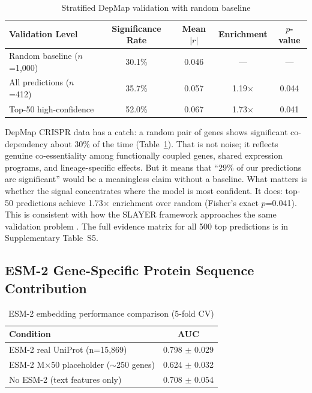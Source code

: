 \documentclass[12pt,a4paper]{article}
\begin{document}
\begin{table}[ht]
\centering
\caption{Stratified DepMap validation with random baseline}
\label{tab:depmap}
\begin{tabular}{lcccc}
\toprule
\textbf{Validation Level} & \textbf{Significance Rate} & \textbf{Mean $|r|$} & \textbf{Enrichment} & \textbf{$p$-value} \\
\midrule
Random baseline ($n$=1,000) & 30.1\% & 0.046 & --- & --- \\
All predictions ($n$=412) & 35.7\% & 0.057 & 1.19$\times$ & 0.044 \\
Top-50 high-confidence & 52.0\% & 0.067 & 1.73$\times$ & 0.041 \\
\bottomrule
\end{tabular}
\end{table}

DepMap CRISPR data has a catch: a random pair of genes shows significant co-dependency about 30\% of the time (Table~\ref{tab:depmap}). That is not noise; it reflects genuine co-essentiality among functionally coupled genes, shared expression programs, and lineage-specific effects. But it means that ``29\% of our predictions are significant'' would be a meaningless claim without a baseline. What matters is whether the signal concentrates where the model is most confident. It does: top-50 predictions achieve 1.73$\times$ enrichment over random (Fisher's exact $p$=0.041). This is consistent with how the SLAYER framework approaches the same validation problem \cite{cohen2024}. The full evidence matrix for all 500 top predictions is in Supplementary Table~S5.

\subsection{ESM-2 Gene-Specific Protein Sequence Contribution}

\begin{table}[ht]
\centering
\caption{ESM-2 embedding performance comparison (5-fold CV)}
\label{tab:esm}
\begin{tabular}{lc}
\toprule
\textbf{Condition} & \textbf{AUC} \\
\midrule
ESM-2 real UniProt (n=15,869) & 0.798 $\pm$ 0.029 \\
ESM-2 M×50 placeholder ($\sim$250 genes) & 0.624 $\pm$ 0.032 \\
No ESM-2 (text features only) & 0.708 $\pm$ 0.054 \\
\bottomrule
\end{tabular}
\end{table}
\end{document}
